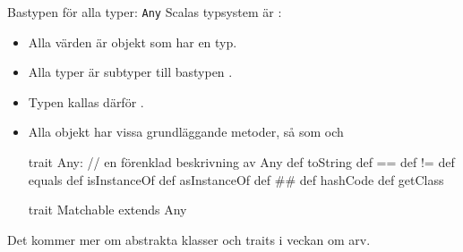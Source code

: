 


\begin{Slide}{Bastypen för alla typer: \texttt{Any}}
\SlideFontSmall
Scalas typsystem är :
\begin{itemize}\SlideFontSmall
  \item Alla värden är objekt som har en typ.
  \item Alla typer är subtyper till bastypen .
  \item Typen  kallas därför .
  \item Alla objekt har vissa grundläggande metoder, så som  och \code{==}
\begin{Code}
trait Any:         // en förenklad beskrivning av Any
  def toString
  def ==
  def !=
  def equals
  def isInstanceOf
  def asInstanceOf
  def ##
  def hashCode
  def getClass

trait Matchable extends Any
\end{Code}
\end{itemize}

Det kommer mer om abstrakta klasser och traits i veckan om arv.
\end{Slide}

